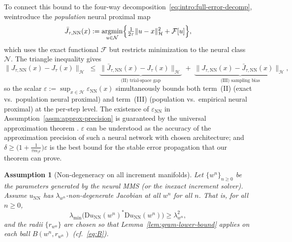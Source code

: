 \documentclass[twoside,11pt]{article}
\newtheorem{assumption}[theorem]{Assumption}
\newcommand{\D}{\mathrm{D}}
\newcommand{\NN}{\mathrm{NN}}
\newcommand{\argmin}{\mathop{\mathrm{arg min}}}
\newcommand{\calF}{\mathcal{F}}
\newcommand{\calH}{\mathcal{H}}
\newcommand{\calN}{\mathcal{N}}
\begin{document}
\begin{remark}
    {\color{green!50!black}%
To connect this bound to the four-way decomposition~\eqref{eq:intro:full-error-decomp},
weintroduce the \emph{population} neural proximal map
\[
  \bar J_{\tau,\NN}(x) := \argmin_{u\in\calN}\Bigl\{\tfrac{1}{2\tau}\|u-x\|_\calH^2 + \calF[u]\Bigr\},
\]
which uses the exact functional $\calF$ but restricts minimization to the neural class~$\calN$.
The triangle inequality gives
\[
  \|J_{\tau,\NN}(x)-J_\tau(x)\|_\calH
  \;\le\;
  \underbrace{\|\bar J_{\tau,\NN}(x)-J_\tau(x)\|_\calH}_{\text{(II) trial-space gap}}
  \;+\;
  \underbrace{\|J_{\tau,\NN}(x)-\bar J_{\tau,\NN}(x)\|_\calH}_{\text{(III) sampling bias}},
\]
so the scalar $\varepsilon:=\sup_{x\in\calH}\varepsilon_\NN(x)$ simultaneously
bounds both term~(II) (exact vs.\ population neural proximal) and term~(III)
(population vs.\ empirical neural proximal) at the per-step level.}
    The existence of $\varepsilon_\NN$ in  Assumption~\ref{assm:approx-precision} is guaranteed by the universal approximation theorem \citep{hornik1989multilayer}. $\varepsilon$ can be understood as the accuracy of the approximation precision of such a  neural network with chosen architecture; and $\delta \geq \Big(1+\frac{1}{\tau m_\calF} \Big) \varepsilon$ is the best bound for the stable error propagation that our theorem can  prove. 
\end{remark}
\fi

\begin{assumption}[Non-degeneracy on all increment manifolds]\label{assm:center-nondeg}
Let $\{w^n\}_{n\ge 0}$ be the parameters generated by the neural MMS (or the inexact increment solver). Assume $u_\NN$ has $\lambda_{w^n}$-non-degenerate Jacobian at all $w^n$ for all $n$. That is, for all $n\ge 0$,
\[
\lambda_{\min}\!\big(\D u_{\NN}(w^n)^* \D u_{\NN}(w^n)\big)\ge \lambda_{w^n}^2,
\]
and the radii $\{r_{w^n}\}$ are chosen so that Lemma~\ref{lem:gram-lower-bound} applies on each ball
$B(w^n, r_{w^n})$ (cf.~\eqref{eq:B}).
\end{assumption}
\end{document}
